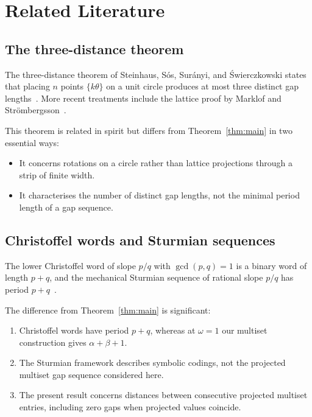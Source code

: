 \documentclass[11pt]{article}
\theoremstyle{plain}
\theoremstyle{definition}
\theoremstyle{remark}
\begin{document}
\section{Related Literature}\label{sec:literature}

\subsection{The three-distance theorem}

The three-distance theorem of Steinhaus, S\'{o}s, Sur\'{a}nyi, and
\'{S}wierczkowski states that placing \(n\) points \(\{k\theta\}\) on a unit
circle produces at most three distinct gap lengths~\cite{ThreeGap,
BertheReutenauer2024}.  More recent treatments include the lattice proof by
Marklof and Str\"{o}mbergsson~\cite{MarklofStrombergsson2017}.

This theorem is related in spirit but differs from Theorem~\ref{thm:main} in
two essential ways:
\begin{itemize}
    \item It concerns rotations on a circle rather than lattice projections
          through a strip of finite width.
    \item It characterises the number of distinct gap lengths, not the
          minimal period length of a gap sequence.
\end{itemize}

\subsection{Christoffel words and Sturmian sequences}

The lower Christoffel word of slope \(p/q\) with \(\gcd(p,q)=1\) is a binary
word of length \(p+q\), and the mechanical Sturmian sequence of rational
slope \(p/q\) has period \(p+q\)~\cite{BerstelEtAl2008}.

The difference from Theorem~\ref{thm:main} is significant:
\begin{enumerate}
    \item Christoffel words have period \(p+q\), whereas at \(\omega = 1\)
          our multiset construction gives \(\alpha+\beta+1\).
    \item The Sturmian framework describes symbolic codings, not the
          projected multiset gap sequence considered here.
    \item The present result concerns distances between consecutive projected
          multiset entries, including zero gaps when projected values
          coincide.
\end{enumerate}
\end{document}
